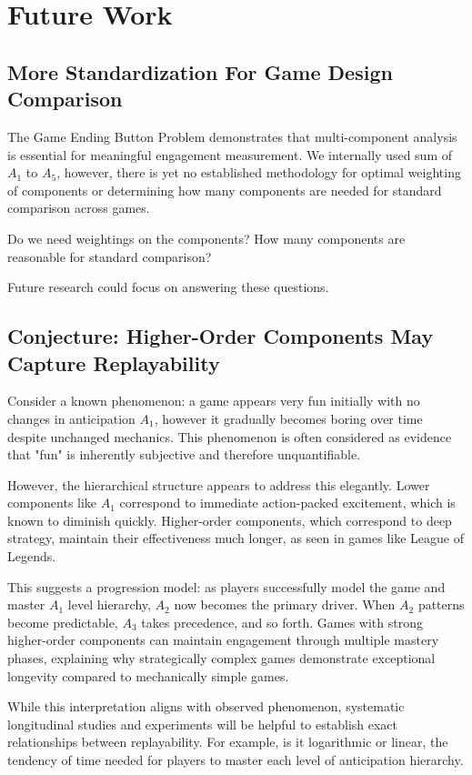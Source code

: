 \documentclass{article}
\begin{document}
\section{Future Work}

\subsection{More Standardization For Game Design Comparison}

The Game Ending Button Problem demonstrates that multi-component analysis is essential for meaningful engagement measurement. We internally used sum of $A_1$ to $A_5$, however, there is yet no established methodology for optimal weighting of components or determining how many components are needed for standard comparison across games.

Do we need weightings on the components? How many components are reasonable for standard comparison?

Future research could focus on answering these questions.

\subsection{Conjecture: Higher-Order Components May Capture Replayability}

Consider a known phenomenon: a game appears very fun initially with no changes in anticipation $A_1$, however it gradually becomes boring over time despite unchanged mechanics. This phenomenon is often considered as evidence that "fun" is inherently subjective and therefore unquantifiable.

However, the hierarchical structure appears to address this elegantly. Lower components like $A_1$ correspond to immediate action-packed excitement, which is known to diminish quickly. Higher-order components, which correspond to deep strategy, maintain their effectiveness much longer, as seen in games like League of Legends.

This suggests a progression model: as players successfully model the game and master $A_1$ level hierarchy, $A_2$ now becomes the primary driver. When $A_2$ patterns become predictable, $A_3$ takes precedence, and so forth. Games with strong higher-order components can maintain engagement through multiple mastery phases, explaining why strategically complex games demonstrate exceptional longevity compared to mechanically simple games.

While this interpretation aligns with observed phenomenon, systematic longitudinal studies and experiments will be helpful to establish exact relationships between replayability.
For example, is it logarithmic or linear, the tendency of time needed for players to master each level of anticipation hierarchy.
\end{document}
